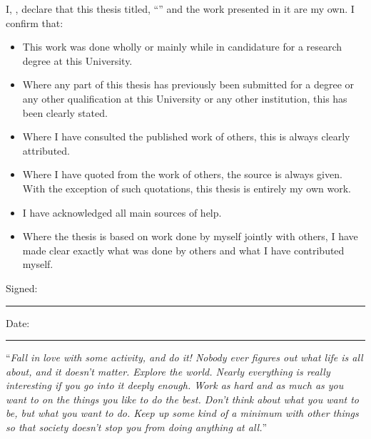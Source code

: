
\begin{declaration}
\addchaptertocentry{\authorshipname} %
\noindent I, \authorname, declare that this thesis titled, \enquote{\ttitle} and the work presented in it are my own. I confirm that:

\begin{itemize} 
\item This work was done wholly or mainly while in candidature for a research degree at this University.
\item Where any part of this thesis has previously been submitted for a degree or any other qualification at this University or any other institution, this has been clearly stated.
\item Where I have consulted the published work of others, this is always clearly attributed.
\item Where I have quoted from the work of others, the source is always given. With the exception of such quotations, this thesis is entirely my own work.
\item I have acknowledged all main sources of help.
\item Where the thesis is based on work done by myself jointly with others, I have made clear exactly what was done by others and what I have contributed myself.\\
\end{itemize}
 
\noindent Signed:\\
\rule[0.5em]{25em}{0.5pt} %
 
\noindent Date:\\
\rule[0.5em]{25em}{0.5pt} %
\end{declaration}

\cleardoublepage


\vspace*{0.2\textheight}

\noindent\enquote{\itshape Fall in love with some activity, and do it! Nobody ever figures out what life is all about, and it doesn't matter. Explore the world. Nearly everything is really interesting if you go into it deeply enough. Work as hard and as much as you want to on the things you like to do the best. Don't think about what you want to be, but what you want to do. Keep up some kind of a minimum with other things so that society doesn't stop you from doing anything at all.}\bigbreak

